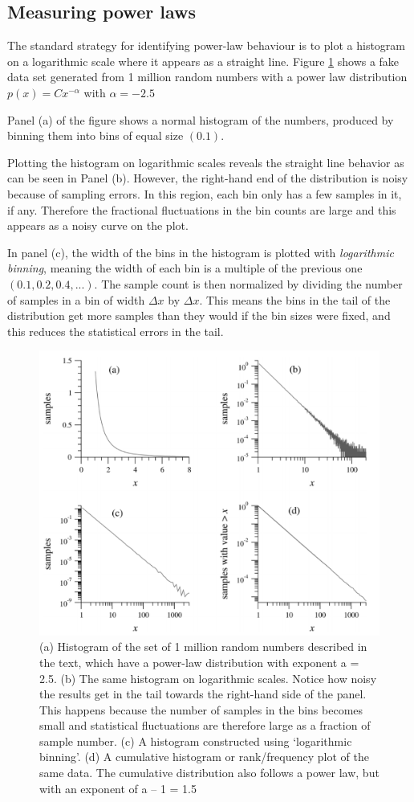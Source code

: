 \documentclass[a4paper, 12pt]{report}
\begin{document}
\subsection{Measuring power laws}
The standard strategy for identifying power-law behaviour is to plot a histogram on a logarithmic scale where it appears as a straight line. Figure \ref{fig:histogram-1-million} shows a fake data set generated from 1 million random numbers with a power law distribution $p(x) = Cx^{- \alpha}$ with $\alpha=-2.5$

Panel (a) of the figure shows a normal histogram of the numbers, produced by binning them into bins of equal size $(0.1)$.

Plotting the histogram on logarithmic scales reveals the straight line behavior as can be seen in Panel (b). However, the right-hand end of the distribution is noisy because of sampling errors. In this region, each bin only has a few samples in it, if any. Therefore the fractional fluctuations in the bin counts are large and this appears as a noisy curve on the plot.

In panel (c), the width of the bins in the histogram is plotted with \textit{logarithmic binning}, meaning the width of each bin is a multiple of the previous one $(0.1,0.2,0.4,...)$. The sample count is then normalized by dividing the number of samples in a bin of width $\Delta x$ by $\Delta x$. This means the bins in the tail of the distribution get more samples than they would if the bin sizes were fixed, and this reduces the statistical errors in the tail.

\begin{figure}[!ht]
\centering
\includegraphics[width=0.7\linewidth]{./histogram-1-million}
\caption{
    (a) Histogram of the set of 1 million random numbers described in the text, which have a power-law distribution with exponent a = 2.5. (b) The same histogram on logarithmic scales. Notice how noisy the results get in the tail towards the right-hand side of the panel. This happens because the number of samples in the bins becomes small and statistical fluctuations are therefore large as a fraction of sample number. (c) A histogram constructed using ‘logarithmic binning’. (d) A cumulative histogram or rank/frequency plot of the same data. The cumulative distribution also follows a power law, but with an exponent of a – 1 = 1.5
}
\label{fig:histogram-1-million}
\end{figure}
\end{document}
